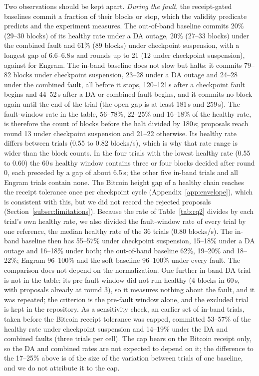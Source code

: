 Two observations should be kept apart. \emph{During the fault}, the receipt-gated
baselines commit a fraction of their blocks or stop, which the validity predicate
predicts and the experiment measures. The out-of-band baseline commits 20\%
(29--30 blocks) of its healthy rate under a DA outage, 20\% (27--33 blocks)
under the combined fault and 61\% (89 blocks) under checkpoint suspension, with a
longest gap of 6.6--6.8\,s and rounds up to 21 (12 under checkpoint suspension),
against \resRQTwoEngram{} for Engram. The in-band baseline does not slow but halts: it commits
79--82 blocks under checkpoint suspension, 23--28 under a DA outage and 24--28 under the combined
fault, all before it stops, 120--121\,s after a checkpoint fault begins and 44--52\,s after a DA or
combined fault begins, and it commits no block again until the end of the trial (the open gap is at least
181\,s and 259\,s). The fault-window rate in the table, 56--78\%, 22--25\% and 16--18\% of the healthy rate,
is therefore the count of blocks before the halt divided by 180\,s; proposals reach round 13 under
checkpoint suspension and 21--22 otherwise. Its healthy
rate differs between trials (0.55 to 0.82 blocks/s), which is why that rate
range is wider than the block counts. In the four trials with the lowest healthy
rate (0.55 to 0.60) the 60\,s healthy window contains three or four blocks decided after
round 0, each preceded by a gap of about 6.5\,s; the other five in-band trials and all Engram trials contain none. The Bitcoin height gap of
a healthy chain reaches the receipt tolerance once per checkpoint cycle
(Appendix~\ref{app:envelope}), which is consistent with this, but we did not
record the rejected proposals (Section~\ref{subsec:limitations}).
Because the rate of Table~\ref{tab:rq2} divides by each trial's own healthy rate, we
also divided the fault-window rate of every trial by one reference, the median healthy rate of the
36 trials (0.80 blocks/s). The in-band baseline then has 55--57\% under checkpoint
suspension, 15--18\% under a DA outage and 16--18\% under both; the out-of-band baseline
62\%, 19--20\% and 18--22\%; Engram 96--100\% and the soft baseline 96--100\% under every fault.
The comparison does not depend on the normalization. One further in-band DA trial is not in the table: its
pre-fault window did not run healthy (4 blocks in 60\,s, with proposals already at
round 3), so it measures nothing about the fault, and it was repeated; the
criterion is the pre-fault window alone, and the excluded trial is kept in the
repository. As a sensitivity check, an earlier set of in-band trials, taken before the
Bitcoin receipt tolerance was capped, committed 53--57\% of the healthy rate under checkpoint
suspension and 14--19\% under the DA and combined faults (three trials per cell). The
cap bears on the Bitcoin receipt only, so the DA and combined rates are not expected to depend on it; the
difference to the 17--25\% above is of the size of the variation between trials of one
baseline, and we do not attribute it to the cap.

